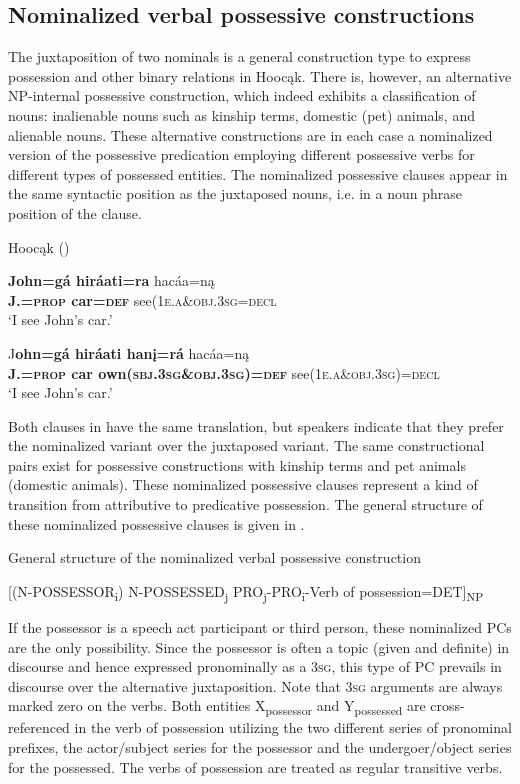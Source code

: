 \documentclass[output=paper]{LSP/langsci}
\begin{document}
\subsection{Nominalized verbal possessive constructions}
The juxtaposition of two nominals is a general construction type to express possession and other binary relations in Hoocąk. There is, however, an alternative NP-internal possessive construction, which indeed exhibits a classification of nouns: inalienable nouns such as kinship terms, domestic (pet) animals, and alienable nouns. These alternative constructions are in each case a nominalized version of the possessive predication employing different possessive verbs for different types of possessed entities. The nominalized possessive clauses appear in the same syntactic position as the juxtaposed nouns, i.e. in a noun phrase position of the clause. 

\ea Hoocąk (\citealt[16]{Helmbrecht2003}) \label{seecar}

\ea 
\gll \textbf{John=g\'a hir\'aati=ra}  hac\'aa=n\k{a} \\
\textbf{J.=\textsc{prop} car=\textsc{def}} see(\textsc{1e.a}\&\textsc{obj.3sg}=\textsc{decl} \\
\glt `I see John's car.'  

\ex 
\gll J\textbf{ohn=g\'a hir\'aati han\k{i}=r\'a} hac\'aa=n\k{a}  \\
\textbf{J.=\textsc{prop} car own(\textsc{sbj.3sg}\&\textsc{obj.3sg})=\textsc{def}} see(\textsc{1e.a}\&\textsc{obj.3sg})=\textsc{decl}  \\
\glt `I see John's car.'
\z
\z 

Both clauses in  have the same translation, but speakers indicate that they prefer the nominalized variant over the juxtaposed variant. The same constructional pairs exist for possessive constructions with kinship terms and pet animals (domestic animals). These nominalized possessive clauses represent a kind of transition from attributive to predicative possession. The general structure of these nominalized possessive clauses is given in .

\ea General structure of the nominalized verbal possessive construction \label{generalstructure}

[(N-POSSESSOR\textsubscript{i})  N-POSSESSED\textsubscript{j}    PRO\textsubscript{j}-PRO\textsubscript{i}-Verb of possession=DET]\textsubscript{NP}
\z

If the possessor is a speech act participant or third person, these nominalized PCs are the only possibility. Since the possessor is often a topic (given and definite) in discourse and hence expressed pronominally as a \textsc{3sg}, this type of PC prevails in discourse over the alternative juxtaposition. Note that \textsc{3sg} arguments are always marked zero on the verbs. Both entities X\textsubscript{possessor} and Y\textsubscript{possessed} are cross-referenced in the verb of possession utilizing the two different series of pronominal prefixes, the actor/subject series for the possessor and the undergoer/object series for the possessed. The verbs of possession are treated as regular transitive verbs.
\end{document}
